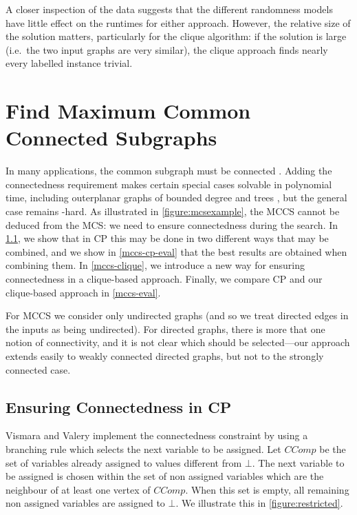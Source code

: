 \documentclass{llncs}
\begin{document}
A closer inspection of the data suggests that the different randomness models have little effect on
the runtimes for either approach. However, the relative size of the solution matters, particularly
for the clique algorithm: if the solution is large (i.e.\ the two input graphs are very similar),
the clique approach finds nearly every labelled instance trivial.

\section{Find Maximum Common Connected Subgraphs}\label{mccs}

In many applications, the common subgraph must be connected
\cite{DBLP:journals/tcs/Koch01,DBLP:journals/jcamd/RaymondW02a,DBLP:conf/mco/VismaraV08,Ehrlich:2011}.
Adding the connectedness requirement makes certain special cases solvable in polynomial time,
including outerplanar graphs of bounded degree \cite{DBLP:journals/algorithms/AkutsuT13} and trees
\cite{DBLP:journals/corr/DroschinskyKM16}, but the general case remains \NP-hard. As illustrated in
\cref{figure:mcsexample}, the MCCS cannot be deduced from the MCS: we need to ensure connectedness
during the search. In \cref{mccs-cp}, we show that in CP this may be done in two different ways that
may be combined, and we show in \cref{mccs-cp-eval} that the best results are obtained when
combining them. In \cref{mccs-clique}, we introduce a new way for ensuring connectedness in a
clique-based approach. Finally, we compare CP and our clique-based approach in \cref{mccs-eval}.

For MCCS we consider only undirected graphs (and so we treat directed edges in the inputs as being
undirected). For directed graphs, there is more that one notion of connectivity, and it is not clear
which should be selected---our approach extends easily to weakly connected directed graphs, but not
to the strongly connected case.

\subsection{Ensuring Connectedness in CP}\label{mccs-cp}

Vismara and Valery \cite{DBLP:conf/mco/VismaraV08} implement the connectedness constraint by using a
branching rule which selects the next variable to be assigned. Let $\mathit{CComp}$ be the
set of variables already assigned to values different from $\bot$. The next variable to be assigned
is chosen within the set of non assigned variables which are the neighbour of at least one vertex of
$\mathit{CComp}$.  When this set is empty, all remaining non assigned variables are assigned to
$\bot$. We illustrate this in \cref{figure:restricted}.
\end{document}
